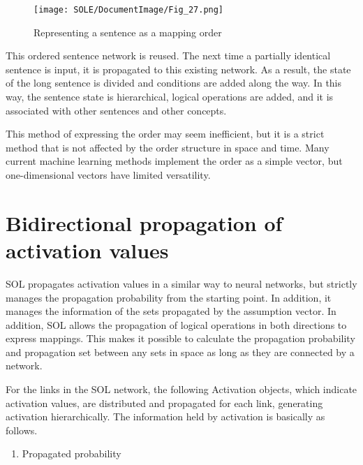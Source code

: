 \documentclass[12pt]{article}
\begin{document}
\begin{figure}[ht]
  \centering
  \texttt{[image: SOLE/DocumentImage/Fig\_27.png]}
  \caption{Representing a sentence as a mapping order}
  \label{fig:representing_a_sentence_as_a_mapping_order}
\end{figure}

This ordered sentence network is reused. The next time a partially
identical sentence is input, it is propagated to this existing network.
As a result, the state of the long sentence is divided and conditions
are added along the way. In this way, the sentence state is
hierarchical, logical operations are added, and it is associated with
other sentences and other concepts.

This method of expressing the order may seem inefficient, but it is a
strict method that is not affected by the order structure in space and
time. Many current machine learning methods implement the order as a
simple vector, but one-dimensional vectors have limited versatility.

\section{Bidirectional propagation of activation values}\label{bidirectional-propagation-of-activation-values}

SOL propagates activation values \hspace{0pt}\hspace{0pt}in a similar
way to neural networks, but strictly manages the propagation probability
from the starting point. In addition, it manages the information of the
sets propagated by the assumption vector. In addition, SOL allows the
propagation of logical operations in both directions to express
mappings. This makes it possible to calculate the propagation
probability and propagation set between any sets in space as long as
they are connected by a network.

For the links in the SOL network, the following Activation objects,
which indicate activation values, are distributed and propagated for
each link, generating activation hierarchically. The information held by
activation is basically as follows.

\begin{enumerate}
\def\labelenumi{\arabic{enumi}.}

\item
  Propagated probability
\end{enumerate}
\end{document}
